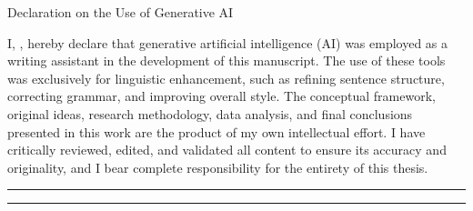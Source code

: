 \begin{customdeclaration}{Declaration on the Use of Generative AI}

\noindent I, \authorname, hereby declare that generative artificial intelligence (AI) was employed as a writing assistant in the development of this manuscript. The use of these tools was exclusively for linguistic enhancement, such as refining sentence structure, correcting grammar, and improving overall style. The conceptual framework, original ideas, research methodology, data analysis, and final conclusions presented in this work are the product of my own intellectual effort. I have critically reviewed, edited, and validated all content to ensure its accuracy and originality, and I bear complete responsibility for the entirety of this thesis.

\vspace{2cm}

\noindent{} \rule[0.5em]{12cm}{0.5pt}

\vspace{1.5cm}

\noindent{} \rule[0.5em]{12cm}{0.5pt}

\end{customdeclaration}

\cleardoublepage